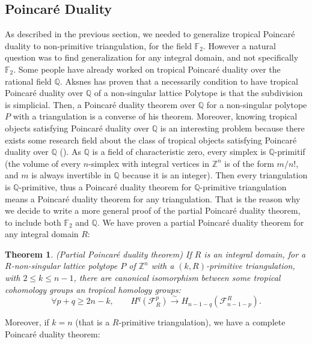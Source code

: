\documentclass{article}
\newtheorem{theorem}{Theorem}
\begin{document}
 \subsection{Poincaré Duality}

As described in the previous section, we needed to generalize tropical Poincaré duality to non-primitive triangulation, for the field $\mathbb{F}_2$. However a natural question was to find generalization for any integral domain, and not specifically $\mathbb{F}_2$. Some people have already worked on tropical Poincaré duality over the rational field $\mathbb{Q}$. Aksnes \cite{Ak 2023} has proven that a necessarily condition to have tropical Poincaré duality over $\mathbb{Q}$ of a non-singular lattice Polytope is that the subdivision is simplicial. Then, a Poincaré duality theorem over $\mathbb{Q}$ for a non-singular polytope $P$ with a triangulation is a converse of his theorem. Moreover, knowing tropical objects satisfying Poincaré duality over $\mathbb{Q}$ is an interesting problem because there exists some research field about the class of tropical objects satisfying Poincaré duality over $\mathbb{Q}$ (\cite{AP 2023}). As $\mathbb{Q}$ is a field of characteristic zero, every simplex is $\mathbb{Q}$-primitif (the volume of every $n$-simplex with integral vertices in $\mathbb{Z}^n$ is of the form $m/n!$, and $m$ is always invertible in $\mathbb{Q}$ because it is an integer). Then every triangulation is $\mathbb{Q}$-primitive, thus a Poincaré duality theorem for $\mathbb{Q}$-primitive triangulation means a Poincaré duality theorem for any triangulation. That is the reason why we decide to write a more general proof of the partial Poincaré duality theorem, to include both $\mathbb{F}_2$ and $\mathbb{Q}$. We have proven a partial Poincaré duality theorem for any integral domain $R$:

\begin{theorem}
    (Partial Poincaré duality theorem) If $R$ is an integral domain, for a $R$-non-singular lattice polytope $P$ of $\mathbb{Z}^n$ with a $(k,R)$-primitive triangulation, with $2\leq k\leq n-1$, there are canonical isomorphism between some tropical cohomology groups an tropical homology groups:
    \begin{equation*}
        \forall p+q \geq 2n-k,~~~~~~~~~H^q(\mathcal{F}^p_{R}) \xrightarrow{\sim}H_{n-1-q}(\mathcal{F}_{n-1-p}^{R}).
    \end{equation*}
    \label{part}
\end{theorem}

Moreover, if $k=n$ (that is a $R$-primitive triangulation), we have a complete Poincaré duality theorem:
\end{document}
